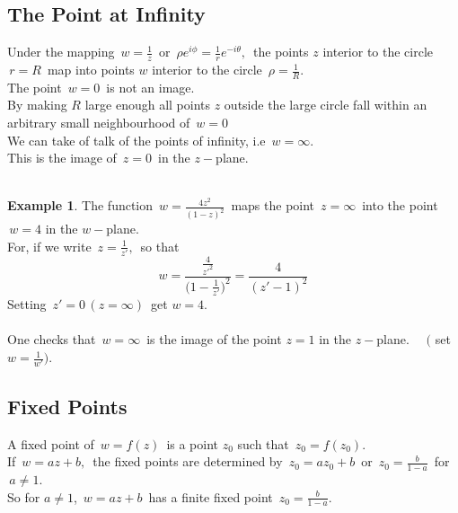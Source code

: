 \documentclass[11pt,a4paper]{article}
\theoremstyle{definition}
\newtheorem{example}[thm]{Example}
\begin{document}
{\color[wave]{485}\subsection{The Point at Infinity}}
Under the mapping $\,  w = \frac{1}{z}\,$ or $\, \rho e^{i\phi} = \frac{1}{r}e^{-i\theta},\,$ the points $z$ interior to the circle $\, r = R\,$ map into points $w$ interior to the circle $\, \rho = \frac{1}{R}$.\\

The point $\, w = 0\,$ is not an image.\\

By making $R$ large enough all points $z$ outside the large circle fall within an arbitrary small neighbourhood of $\, w = 0$\\

We can take of talk of the points of infinity, i.e $\, w = \infty.$\\

This is the image of $\, z = 0\,$ in the $z-$plane.\\\\




\begin{example}
The function $\, w =\frac{4z^2}{(1 - z)^2}\,$ maps the point $\, z = \infty\,$ into the point $\, w = 4$ in the $w-$plane.\\

For, if we write $\, z = \frac{1}{z'},\,$ so that $$ w = \frac{\frac{4}{z'^2}}{\Big(1 - \frac{1}{z'}\Big)^2} = \frac{4}{(z' - 1)^2}$$
Setting $\, z' = 0 \, (z =\infty)\,$ get $w = 4$.\\\\

One checks that $\, w = \infty\,$ is the image of the point $z = 1$ in the $z-$plane. $\quad  \Big($ set $w = \frac{1}{w'}\Big)$.
\end{example}

{\color[wave]{485}\subsection{Fixed Points}}
A fixed point of $\, w = f(z)\,$ is a point $z_0$ such that $\, z_0 = f(z_0)$.\\

If $\, w = az + b,\,$ the fixed points are determined by $\, z_0 = az_0 + b \,$ or $\, z_0 = \frac{b}{ 1 - a}\,$ for $\, a\neq 1$.\\

So for $a\neq 1$, $\, w = az + b\,$ has a finite fixed point $\, z_0 = \frac{b}{1 - a}$.\\
\end{document}

